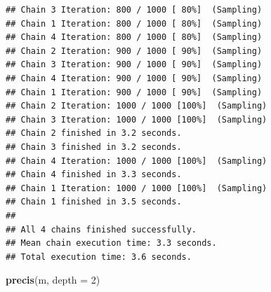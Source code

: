 \documentclass[
]{book}
\newenvironment{Shaded}{\begin{snugshade}}{\end{snugshade}}
\newcommand{\AttributeTok}[1]{\textcolor[rgb]{0.13,0.29,0.53}{#1}}
\newcommand{\DecValTok}[1]{\textcolor[rgb]{0.00,0.00,0.81}{#1}}
\newcommand{\FunctionTok}[1]{\textcolor[rgb]{0.13,0.29,0.53}{\textbf{#1}}}
\newcommand{\NormalTok}[1]{#1}
\begin{document}
\begin{verbatim}
## Chain 3 Iteration: 800 / 1000 [ 80%]  (Sampling) 
## Chain 1 Iteration: 800 / 1000 [ 80%]  (Sampling) 
## Chain 4 Iteration: 800 / 1000 [ 80%]  (Sampling) 
## Chain 2 Iteration: 900 / 1000 [ 90%]  (Sampling) 
## Chain 3 Iteration: 900 / 1000 [ 90%]  (Sampling) 
## Chain 4 Iteration: 900 / 1000 [ 90%]  (Sampling) 
## Chain 1 Iteration: 900 / 1000 [ 90%]  (Sampling) 
## Chain 2 Iteration: 1000 / 1000 [100%]  (Sampling) 
## Chain 3 Iteration: 1000 / 1000 [100%]  (Sampling) 
## Chain 2 finished in 3.2 seconds.
## Chain 3 finished in 3.2 seconds.
## Chain 4 Iteration: 1000 / 1000 [100%]  (Sampling) 
## Chain 4 finished in 3.3 seconds.
## Chain 1 Iteration: 1000 / 1000 [100%]  (Sampling) 
## Chain 1 finished in 3.5 seconds.
## 
## All 4 chains finished successfully.
## Mean chain execution time: 3.3 seconds.
## Total execution time: 3.6 seconds.
\end{verbatim}

\begin{Shaded}
\begin{Highlighting}[]
\FunctionTok{precis}\NormalTok{(m, }\AttributeTok{depth =} \DecValTok{2}\NormalTok{)}
\end{Highlighting}
\end{Shaded}
\end{document}
